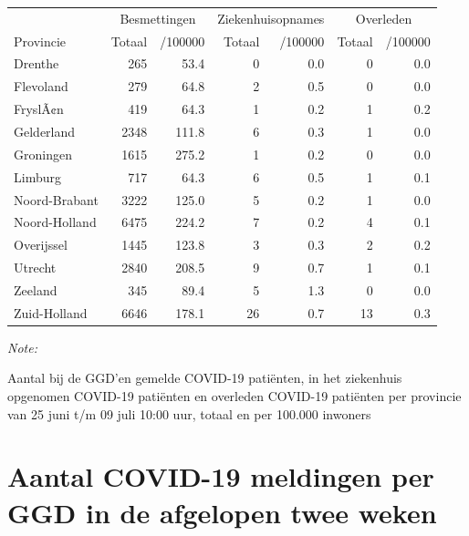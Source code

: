 \documentclass[
  english,
  man,floatsintext]{apa6}
\begin{document}
\begin{table}
\centering
\begin{threeparttable}
\begin{tabular}{lrrrrrr}
\toprule
\multicolumn{1}{c}{ } & \multicolumn{2}{c}{Besmettingen} & \multicolumn{2}{c}{Ziekenhuisopnames} & \multicolumn{2}{c}{Overleden} \\
\cmidrule(l{3pt}r{3pt}){2-3} \cmidrule(l{3pt}r{3pt}){4-5} \cmidrule(l{3pt}r{3pt}){6-7}
Provincie & Totaal & /100000 & Totaal & /100000 & Totaal & /100000\\
\midrule
Drenthe & 265 & 53.4 & 0 & 0.0 & 0 & 0.0\\
Flevoland & 279 & 64.8 & 2 & 0.5 & 0 & 0.0\\
FryslÃ¢n & 419 & 64.3 & 1 & 0.2 & 1 & 0.2\\
Gelderland & 2348 & 111.8 & 6 & 0.3 & 1 & 0.0\\
Groningen & 1615 & 275.2 & 1 & 0.2 & 0 & 0.0\\
Limburg & 717 & 64.3 & 6 & 0.5 & 1 & 0.1\\
Noord-Brabant & 3222 & 125.0 & 5 & 0.2 & 1 & 0.0\\
Noord-Holland & 6475 & 224.2 & 7 & 0.2 & 4 & 0.1\\
Overijssel & 1445 & 123.8 & 3 & 0.3 & 2 & 0.2\\
Utrecht & 2840 & 208.5 & 9 & 0.7 & 1 & 0.1\\
Zeeland & 345 & 89.4 & 5 & 1.3 & 0 & 0.0\\
Zuid-Holland & 6646 & 178.1 & 26 & 0.7 & 13 & 0.3\\
\bottomrule
\end{tabular}
\begin{tablenotes}
\item \textit{Note: } 
\item Aantal bij de GGD’en gemelde COVID-19 patiënten, in het ziekenhuis opgenomen COVID-19 patiënten en overleden COVID-19 patiënten per provincie van 25 juni t/m 09 juli 10:00 uur, totaal en per 100.000 inwoners
\end{tablenotes}
\end{threeparttable}
\end{table}

\newpage

\hypertarget{aantal-covid-19-meldingen-per-ggd-in-de-afgelopen-twee-weken}{%
\section{Aantal COVID-19 meldingen per GGD in de afgelopen twee weken}\label{aantal-covid-19-meldingen-per-ggd-in-de-afgelopen-twee-weken}}
\end{document}
